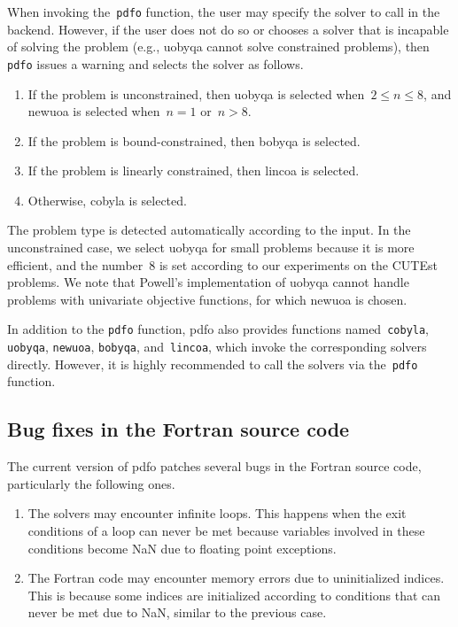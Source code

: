 \documentclass[
    smallextended,  %
    final,          %
]{svjour3}
\newcommand{\iter}[1][k]{x\ifthenelse{\equal{#1}{}}{}{_{#1}}}
\newcommand{\xpt}[1][k]{\mathcal{Y}\ifthenelse{\equal{#1}{}}{}{_{#1}}}
\newcommand{\pdfofun}{\texttt{pdfo}\xspace}
\newcommand{\cobylafun}{\texttt{cobyla}\xspace}
\newcommand{\newuoafun}{\texttt{newuoa}\xspace}
\newcommand{\bobyqafun}{\texttt{bobyqa}\xspace}
\newcommand{\lincoafun}{\texttt{lincoa}\xspace}
\begin{document}
When invoking the~\pdfofun function, the user may specify the solver to call in the backend.
However, if the user does not do so or chooses a solver that is incapable of solving the problem (e.g., \gls{uobyqa} cannot solve
constrained problems), then \pdfofun issues a warning and selects the solver as follows.
\begin{enumerate}
    \item If the problem is unconstrained, then \gls{uobyqa} is selected when~$2 \le n \le 8$, and \gls{newuoa} is selected when~$n = 1$ or~$n > 8$.
    \item If the problem is bound-constrained, then \gls{bobyqa} is selected.
    \item If the problem is linearly constrained, then \gls{lincoa} is selected.
    \item Otherwise, \gls{cobyla} is selected.
\end{enumerate}
The problem type is detected automatically according to the input.
In the unconstrained case, we select \gls{uobyqa} for small problems because it is more efficient,
and the number~$8$ is set according to our experiments on the CUTEst~\cite{Gould_Orban_Toint_2015} problems.
We note that Powell's implementation of \gls{uobyqa} cannot handle problems with univariate
objective functions, for which \gls{newuoa} is chosen.

In addition to the \pdfofun function, \gls{pdfo} also provides functions named~\cobylafun,
\texttt{uobyqa}, \newuoafun, \bobyqafun, and~\lincoafun, which invoke the
corresponding solvers directly. However, it is highly recommended to call the solvers
via the~\pdfofun function.

\subsection{Bug fixes in the Fortran source code}
\label{subsec:bug-corrections}

The current version of \gls{pdfo} patches several bugs in the Fortran source code, particularly the following ones.
\begin{enumerate}
    \item The solvers may encounter infinite loops.
    This happens when the exit conditions of a loop can never be met because variables involved in
    these conditions become NaN due to floating point exceptions.
    \item The Fortran code may encounter memory errors due to uninitialized indices.
    This is because some indices are initialized according to conditions that can never be met due to NaN, similar to the previous case.
\end{enumerate}
\end{document}
